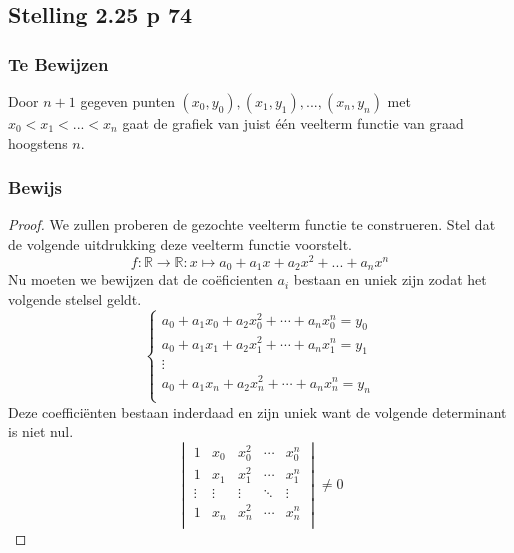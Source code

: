 \documentclass[lineaire_algebra_oplossingen.tex]{subfiles}
\begin{document}
\subsection{Stelling 2.25 p 74}
\subsubsection*{Te Bewijzen}
Door $n+1$ gegeven punten $(x_0,y_0),(x_1,y_1),...,(x_n,y_n)$ met $x_0 < x_1 < ... < x_n$ gaat de grafiek van juist \'e\'en veelterm functie van graad hoogstens $n$.
\subsubsection*{Bewijs}
\begin{proof}
We zullen proberen de gezochte veelterm functie te construeren.
Stel dat de volgende uitdrukking deze veelterm functie voorstelt.
\[
f: \mathbb{R} \rightarrow \mathbb{R} : x \mapsto a_0 + a_1x + a_2x^2+...+a_nx^n
\]
Nu moeten we bewijzen dat de co\"eficienten $a_i$ bestaan en uniek zijn zodat het volgende stelsel geldt.
\[
\left\lbrace
\begin{array}{ c }
a_0 + a_1x_0 + a_2x_0^2 + \cdots + a_nx_0^n = y_0\\
a_0 + a_1x_1 + a_2x_1^2 + \cdots + a_nx_1^n = y_1\\
\vdots\\
a_0 + a_1x_n + a_2x_n^2 + \cdots + a_nx_n^n = y_n\\
\end{array}
\right.
\]
Deze coeffici\"enten bestaan inderdaad en zijn uniek want de volgende determinant is niet nul.
\[
\begin{vmatrix}
1 & x_0 & x_0^2 & \cdots & x_0^n\\
1 & x_1 & x_1^2 & \cdots & x_1^n\\
\vdots & \vdots & \vdots & \ddots & \vdots \\
1 & x_n & x_n^2 & \cdots & x_n^n\\
\end{vmatrix}
\neq 0
\]
\end{proof}
\end{document}

